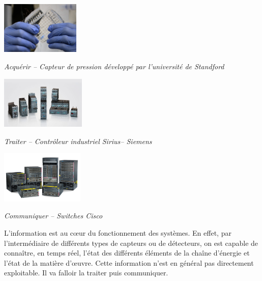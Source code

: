 \documentclass[10pt]{article}
\newif\ifxp
\begin{document}
\ifxp

\else

\fi



\begin{minipage}[c]{.3\linewidth}
\begin{center}
\includegraphics[height=2.5cm]{images/capteur1}

\textit{Acquérir -- Capteur de pression développé par l'université de Standford \cite{capteur1}}
\end{center}
\end{minipage}\hfill
\begin{minipage}[c]{.3\linewidth}
\begin{center}
\includegraphics[height=2.5cm]{images/siemens}

\textit{Traiter -- Contrôleur industriel Sirius-- Siemens \cite{siemens}}
\end{center}
\end{minipage}\hfill
\begin{minipage}[c]{.3\linewidth}
\begin{center}
\includegraphics[height=2.5cm]{images/switch}

\textit{Communiquer -- Switches Cisco \cite{cisco}}
\end{center}
\end{minipage}

\vspace{1cm}




L'information est au c\oe{}ur du fonctionnement des systèmes. En effet, par l'intermédiaire de différents types de capteurs ou de détecteurs, on est capable de connaître, en temps réel, l'état des différents éléments de la chaîne d'énergie et l'état de la matière d'\oe{}uvre. Cette information n'est en général pas directement exploitable. Il va falloir la traiter puis communiquer.
\end{document}
